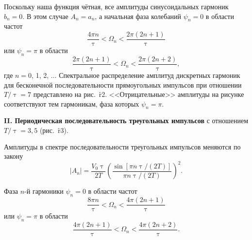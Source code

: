 \begin{figure}[t]%
\noindent
\hfill{}
\hfill{}
\hfill
\uvcs
\end{figure}%

Поскольку наша функция чётная, все амплитуды синусоидальных гармоник $b_n=0$. В этом случае $A_n=a_n$, а начальная фаза
колебаний $\psi_n=0$ в области частот
\begin{equation}
	\frac{4\pi n}{\uptau}<\Omega_n<\frac{2\pi (2n+1)}{\uptau}
\end{equation}
или $\psi_n=\pi$ в области
\begin{equation}
	\frac{2\pi(2n+1)}{\uptau}<\Omega_n<\frac{2\pi (2n+2)}{\uptau},
\end{equation}
где $n=0$, 1, 2, $\dots$ Спектральное распределение амплитуд дискретных гармоник для бесконечной последовательности прямоугольных импульсов при отношении $T/\uptau=7$ представлено на рис.~\r{r2}. <<Отрицательные>> амплитуды на рисунке соответствуют тем гармоникам, фаза которых $\psi_n=\pi$.

{\bf II. Периодическая последовательность треугольных импульсов} с отношением $T/\uptau=3{,}5$ (рис.~\r{r3}).

Амплитуды в спектре последовательности треугольных импульсов меняются по закону
\begin{equation}
	|A_n|=\frac{V_0\uptau}{2T} \left(\frac{\sin[\pi n\uptau/(2T)]} {\pi n\uptau/(2T)}\right)^2.
\end{equation}

Фаза $n$-й гармоники $\psi_n=0$ в области частот
\begin{equation}
	\frac{8\pi n}{\uptau}<\Omega_n<\frac{4\pi (2n+1)}{\uptau}
\end{equation}
или $\psi_n=\pi$ в области
\begin{equation}
	\frac{4\pi(2n+1)}{\uptau}<\Omega_n<\frac{4\pi(2n+2)}{\uptau}.
\end{equation}

